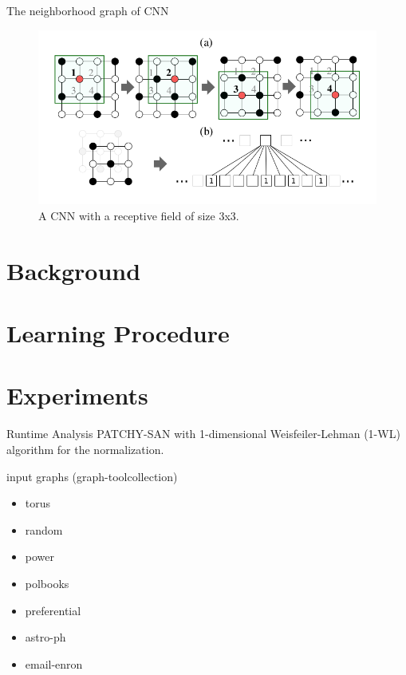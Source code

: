 \documentclass[dvipdfmx]{beamer}
\begin{document}
  \begin{frame}{The neighborhood graph of CNN}
    \begin{figure}[h]
      \centering
      \includegraphics[width=0.7\paperwidth]{img/Fig1.png}
      \caption{A CNN with a receptive field of size 3x3.}
    \end{figure}
  \end{frame}

\section{Background}

\section{Learning Procedure}

\section{Experiments}

  \begin{frame}{Runtime Analysis}
    PATCHY-SAN with 1-dimensional Weisfeiler-Lehman (1-WL) algorithm for the normalization.
    \vspace{5mm}

    \begin{block}{input graphs (graph-tool\footnotemark collection)}
      \begin{itemize}
        \item torus
        \item random
        \item power
        \item polbooks
        \item preferential
        \item astro-ph
        \item email-enron
      \end{itemize}
    \end{block}
  \end{frame}
\end{document}

